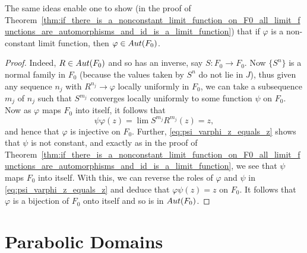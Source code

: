 \begin{remark}
    The same ideas enable one to show (in the proof of
    Theorem~\ref{thm:if_there_is_a_nonconstant_limit_function_on_F0_all_limit_functions_are_automorphisms_and_id_is_a_limit_function})
    that if $\varphi$ is a non-constant limit function, then $\varphi \in
    \mathop{Aut}({F_0})$. 
\end{remark}
\begin{proof}
    Indeed, $R \in \mathop{Aut}({F_0})$ and so has an inverse, say $S: F_0 \to
    F_0$. Now $\{S^n\}$ is a normal family in $F_0$ (because the values taken by
    $S^n$ do not lie in $J$), thus given any sequence $n_j$ with $R^{n_j} \to
    \varphi$ locally uniformly in $F_0$, we can take a subsequence $m_j$ of
    $n_j$ such that $S^{m_j}$ converges locally uniformly to some function
    $\psi$ on $F_0$. Now as $\varphi$ maps $F_0$ into itself, it follows that
    \begin{equation}
        \label{eq:psi_varphi_z_equals_z}
        \psi\varphi(z) = \lim S^{m_j}R^{m_j}(z) = z,
    \end{equation}
    and hence that $\varphi$ is injective on $F_0$. Further,
    \eqref{eq:psi_varphi_z_equals_z} shows that $\psi$ is not constant, and
    exactly as in the proof of
    Theorem~\ref{thm:if_there_is_a_nonconstant_limit_function_on_F0_all_limit_functions_are_automorphisms_and_id_is_a_limit_function},
    we see that $\psi$ maps $F_0$ into itself. With this, we can reverse the
    roles of $\varphi$ and $\psi$ in \eqref{eq:psi_varphi_z_equals_z} and deduce
    that $\varphi\psi(z) = z$ on $F_0$. It follows that $\varphi$ is a bijection
    of $F_0$ onto itself and so is in $\mathop{Aut}({F_0})$.
\end{proof}

\section{Parabolic Domains}
\label{sec:parabolic_domains}

